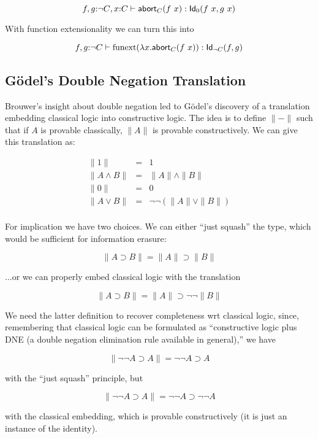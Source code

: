 \documentclass[11pt]{article}
\begin{document}
\[
{f,g}{:}{\lnot C}, x{:}C \vdash \mathsf{abort}_{C}(f\ x)
 : \mathsf{Id}_{0}(f\ x, g\ x)
\]

With function extensionality we can turn this into

\[
{f,g}{:}{\lnot C} \vdash \operatorname{funext}(\lambda{x}.\mathsf{abort}_{C}(f\ x))
 : \mathsf{Id}_{\lnot C}(f, g)
\]


\subsection{G{\"o}del's Double Negation Translation}
\newcommand{\dnt}[1]{{\parallel}{#1}{\parallel}}
\renewcommand{\implies}{\supset}

Brouwer's insight about double negation led to G{\"o}del's discovery of a
translation embedding classical logic into constructive logic.  The idea is
to define $\dnt{-}$ such that if $A$ is provable classically, $\dnt{A}$ is
provable constructively. We can give this translation as:

\begin{eqnarray*}
\dnt{1}           &=& 1\\
\dnt{A\land B}    &=& \dnt{A} \land \dnt{B}\\
\dnt{0}           &=& 0\\
\dnt{A\lor B}     &=& \lnot\lnot(\dnt{A} \lor \dnt{B})\\
\end{eqnarray*}

For implication we have two choices. We can either ``just squash'' the
type, which would be sufficient for information erasure:

\[
\dnt{A\implies B} = \dnt{A} \implies \dnt{B}
\]

...or we can properly embed classical logic with the translation

\[
\dnt{A\implies B} = \dnt{A} \implies \lnot\lnot\dnt{B}
\]

We need the latter definition to recover completeness wrt classical logic,
since, remembering that classical logic can be formulated as ``constructive
logic plus DNE (a double negation elimination rule available in general),''
we have

\[
\dnt{\lnot\lnot A\implies A} = \lnot\lnot A\implies A
\]

with the ``just squash'' principle, but

\[
\dnt{\lnot\lnot A\implies A} = \lnot\lnot A\implies \lnot\lnot A
\]

with the classical embedding, which is provable constructively (it is just
an instance of the identity).
\end{document}
